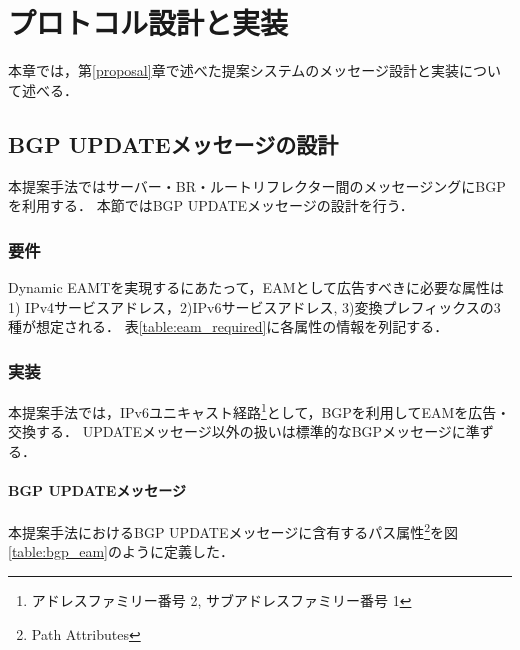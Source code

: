 \chapter{プロトコル設計と実装}
\label{implementation}
本章では，第\ref{proposal}章で述べた提案システムのメッセージ設計と実装について述べる．

\section{BGP UPDATEメッセージの設計}
本提案手法ではサーバー・BR・ルートリフレクター間のメッセージングにBGPを利用する．
本節ではBGP UPDATEメッセージの設計を行う．
\subsection{要件}
Dynamic EAMTを実現するにあたって，EAMとして広告すべきに必要な属性は1) IPv4サービスアドレス，2)IPv6サービスアドレス, 3)変換プレフィックスの3種が想定される．
表\ref{table:eam_required}に各属性の情報を列記する．

\begin{table}[h]
    \label{table:eam_required}
    \caption{EAMに必要な情報}
\end{table}

\subsection{実装}
本提案手法では，IPv6ユニキャスト経路\footnote{アドレスファミリー番号 2, サブアドレスファミリー番号 1\cite{IANA_AFI,IANA_SAFI}}として，BGPを利用してEAMを広告・交換する．
UPDATEメッセージ以外の扱いは標準的なBGPメッセージに準ずる．

\subsubsection{BGP UPDATEメッセージ}
本提案手法におけるBGP UPDATEメッセージに含有するパス属性\footnote{Path Attributes}を図\ref{table:bgp_eam}のように定義した．


